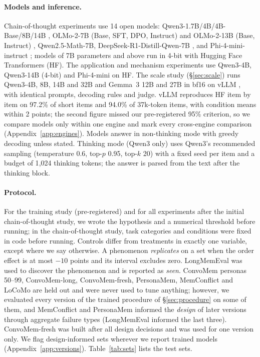 \documentclass[11pt]{article}
\begin{document}
\paragraph{Models and inference.}
Chain-of-thought experiments use 14 open models: Qwen3-1.7B/4B/4B-Base/8B/14B \citep{qwen3}, OLMo-2-7B (Base, SFT, DPO, Instruct) and OLMo-2-13B (Base, Instruct) \citep{olmo2}, Qwen2.5-Math-7B, DeepSeek-R1-Distill-Qwen-7B \citep{deepseekr1}, and Phi-4-mini-instruct \citep{phi4mini}; models of 7B parameters and above run in 4-bit with Hugging Face Transformers (HF). The application and mechanism experiments use Qwen3-4B, Qwen3-14B (4-bit) and Phi-4-mini on HF.
The scale study (\S\ref{sec:scale}) runs Qwen3-4B, 8B, 14B and 32B and Gemma~3 12B and 27B \citep{gemma3} in bf16 on vLLM \citep{kwon2023vllm}, with identical prompts, decoding rules and judge. vLLM reproduces HF item by item on 97.2\% of short items and 94.0\% of 37k-token items, with condition means within 2 points; the second figure missed our pre-registered 95\% criterion, so we compare models only within one engine and mark every cross-engine comparison (Appendix~\ref{app:engines}).
Models answer in non-thinking mode with greedy decoding unless stated. Thinking mode (Qwen3 only) uses Qwen3's recommended sampling (temperature 0.6, top-$p$ 0.95, top-$k$ 20) with a fixed seed per item and a budget of 1{,}024 thinking tokens; the answer is parsed from the text after the thinking block.

\paragraph{Protocol.}
For the training study (pre-registered) and for all experiments after the initial chain-of-thought study, we wrote the hypothesis and a numerical threshold before running; in the chain-of-thought study, task categories and conditions were fixed in code before running. Controls differ from treatments in exactly one variable, except where we say otherwise.
A phenomenon \emph{replicates} on a set when the order effect is at most $-10$ points and its interval excludes zero.
LongMemEval was used to discover the phenomenon and is reported as \emph{seen}. ConvoMem personas 50--99, ConvoMem-long, ConvoMem-fresh, PersonaMem, MemConflict and LoCoMo are held out and were never used to tune anything; however, we evaluated every version of the trained procedure of \S\ref{sec:procedure} on some of them, and MemConflict and PersonaMem informed the \emph{design} of later versions through aggregate failure types (LongMemEval informed the last three). ConvoMem-fresh was built after all design decisions and was used for one version only. We flag design-informed sets wherever we report trained models (Appendix~\ref{app:versions}).
Table~\ref{tab:sets} lists the test sets.
\end{document}
